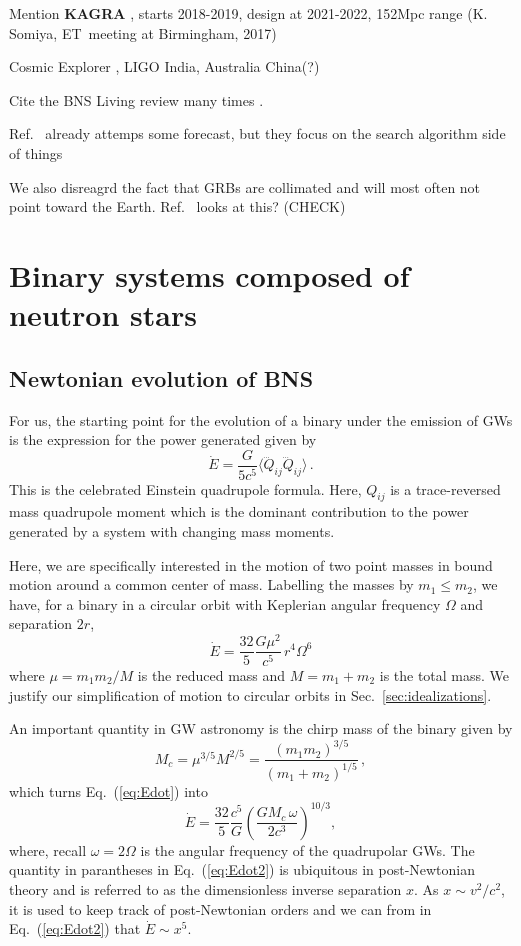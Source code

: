 \documentclass[amsmath,amssymb,aps,floats,amsfonts,notitlepage,superscriptaddress,eqsecnum,nofootinbib,10pt]{revtex4-1}
\newcommand{\f}{\frac}
\newcommand{\be}{\begin{equation}}
\newcommand{\ee}{\end{equation}}
\begin{document}
Mention {\bf KAGRA} \cite{KAGRA, KAGRA2}, starts 2018-2019, design at 2021-2022, 152Mpc range (K. Somiya, ET meeting at Birmingham, 2017)

Cosmic Explorer \cite{CE}, LIGO India, Australia China(?)

Cite the BNS Living review many times \cite{Faber:2012rw}.

Ref.~\cite{Cannon:2011vi} already attemps some forecast, but they focus on the search algorithm side of things

We also disreagrd the fact that GRBs are collimated and will most often not point toward the Earth. Ref.~\cite{Patricelli:2016bkt} looks at this? (CHECK)

\section{Binary systems composed of neutron stars}\label{sec:BNS_inspiral}
\subsection{Newtonian evolution of BNS}
For us, the starting point for the evolution of a binary under the emission of GWs is the expression for the power generated given by 
%
\be
\dot{E} = \f{G}{5c^5}\langle \dddot{Q}_{ij}\dddot{Q}_{ij} \rangle \label{eq:Edot_quadrupole}\, .
\ee
%
This is the celebrated Einstein quadrupole formula. 
Here, $Q_{ij}$ is a trace-reversed mass quadrupole moment which
is the dominant contribution to the power generated %
by a system with changing mass moments. 

Here, we are specifically interested in the motion of two point masses in bound motion around a common center of mass.
Labelling the masses by $m_1 \le m_2$, we have, for a binary in a circular orbit with Keplerian angular frequency $\Omega$ and separation $2r$,
%
\be
\dot{E} = \f{32}{5}\f{G\mu^2}{c^5}\, r^4 \Omega^6\label{eq:Edot}
\ee
%
where $\mu= m_1 m_2/M$ is the reduced mass and $M=m_1+m_2$ is the total mass. 
We justify our simplification of motion to circular orbits in Sec.~\ref{sec:idealizations}.

An important quantity in GW astronomy is the chirp mass of the binary given by
%
\be
M_c = \mu^{3/5} M^{2/5} = \f{(m_1 m_2)^{3/5}}{(m_1+m_2)^{1/5}} \label{eq:chirp_mass}\, ,
\ee
%
which turns Eq.~(\ref{eq:Edot}) into
%
\be
\dot{E} = \f{32}{5}\f{c^5}{G} \left(\f{G M_c\, \omega}{2c^3}\right)^{10/3}, \label{eq:Edot2}
\ee
%
where, recall $\omega=2\Omega$ is the angular frequency of the quadrupolar GWs. 
The quantity in parantheses in Eq.~(\ref{eq:Edot2}) is ubiquitous in post-Newtonian theory and is
referred to as the dimensionless inverse separation $x$.
As $x\sim v^2/c^2$, it is used to keep track of post-Newtonian orders and we can from in Eq.~(\ref{eq:Edot2}) that $\dot{E}\sim x^5$. 
\end{document}
